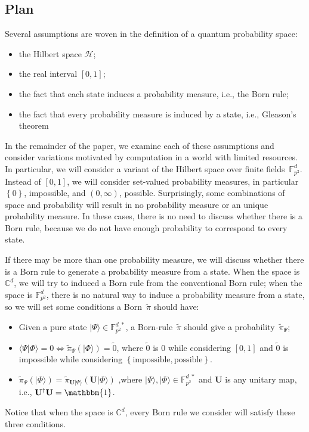 \documentclass{article}
\theoremstyle{remark}
\newcommand{\Hilb}{\mathcal{H}}
\newcommand{\ket}[1]{|#1\rangle}
\newcommand{\ip}[2]{\langle #1 | #2 \rangle}
\newcommand{\yutsung}[1]{\fbox{\begin{minipage}{0.9\textwidth}\color{purple}{Yu-Tsung says: #1}\end{minipage}}}
\newcommand{\ffzd}[1]{{\mathbb{F}^{d\;*}_{#1}}}
\begin{document}


\subsection{Plan}

Several assumptions are woven in the definition of a quantum probability space:
\begin{itemize}
\item the Hilbert space $\Hilb$;
\item the real interval $[0,1]$; 
\item the fact that each state induces a probability measure, i.e., the Born rule;
\item the fact that every probability measure is induced by a state,
  i.e., Gleason's theorem
\end{itemize}

In the remainder of the paper, we examine each of these assumptions
and consider variations motivated by computation in a world with limited
resources. In particular, we will consider a variant of the Hilbert
space over finite fields~$\mathbb{F}_{p^{2}}^{d}$. Instead of $\left[0,1\right]$,
we will consider set-valued probability measures, in particular $\left\{ 0\right\} $,
impossible, and $\left(0,\infty\right)$, possible. Surprisingly,
some combinations of space and probability will result in no probability
measure or an unique probability measure. In these cases, there is
no need to discuss whether there is a Born rule, because we do not
have enough probability to correspond to every state.

If there may be more than one probability measure, we will discuss
whether there is a Born rule to generate a probability measure from
a state. When the space is $\mathbb{C}^{d}$, we will try to induced
a Born rule from the conventional Born rule; when the space is $\mathbb{F}_{p^{2}}^{d}$,
there is no natural way to induce a probability measure from a state,
so we will set some conditions a Born~$\tilde{\pi}$ should have:
\begin{itemize}
\item Given a pure state $\ket{\Psi}\in\ffzd{p^{2}}$, a Born-rule~$\tilde{\pi}$
should give a probability~$\tilde{\pi}_{\Psi}$;
\item $\ip{\Psi}{\Phi}=0\Leftrightarrow\tilde{\pi}_{\Psi}\left(\ket{\Phi}\right)=\tilde{0}$,
where $\tilde{0}$ is $0$ while considering $\left[0,1\right]$ and
$\tilde{0}$ is impossible while considering $\left\{ \textrm{impossible},\textrm{possible}\right\} $.
\item $\tilde{\pi}_{\Psi}\left(\ket{\Phi}\right)=\tilde{\pi}_{\mathbf{U}\ket{\Psi}}\left(\mathbf{U}\ket{\Phi}\right)\textrm{ ,}$where
$\ket{\Psi},\ket{\Phi}\in\ffzd{p^{2}}$ and $\mathbf{U}$ is any unitary
map, i.e., $\mathbf{U}^{\dagger}\mathbf{U}=\mathbbm{1}$. 
\end{itemize}
Notice that when the space is $\mathbb{C}^{d}$, every Born rule we
consider will satisfy these three conditions.
\end{document}
